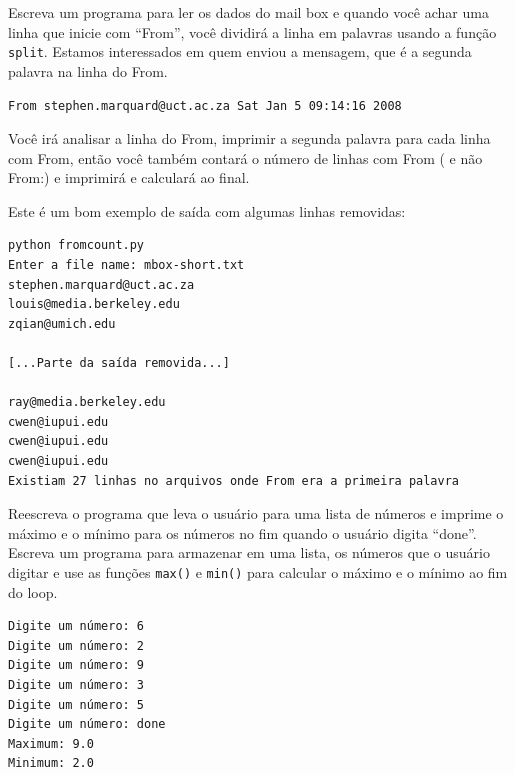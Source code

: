 \begin{ex}
Escreva um programa para ler os dados do mail box e quando você achar
uma linha que inicie com ``From'', você dividirá a linha em palavras 
usando a função {\tt split}. Estamos interessados em quem enviou a mensagem,
que é a segunda palavra na linha do From.

{\tt From stephen.marquard@uct.ac.za Sat Jan  5 09:14:16 2008 }

Você irá analisar a linha do From, imprimir a segunda palavra
para cada linha com From, então você também contará o número de 
linhas com From ( e não From:) e imprimirá e calculará ao final.

Este é um bom exemplo de saída com algumas linhas removidas:

\beforeverb
\begin{verbatim}
python fromcount.py 
Enter a file name: mbox-short.txt
stephen.marquard@uct.ac.za
louis@media.berkeley.edu
zqian@umich.edu

[...Parte da saída removida...]

ray@media.berkeley.edu
cwen@iupui.edu
cwen@iupui.edu
cwen@iupui.edu
Existiam 27 linhas no arquivos onde From era a primeira palavra
\end{verbatim}
\afterverb
%
\end{ex}

\begin{ex}

Reescreva o programa que leva o usuário para uma lista de 
números e imprime o máximo e o mínimo para os números no fim 
quando o usuário digita ``done''. Escreva um programa para armazenar
em uma lista, os números que o usuário digitar e use as funções
{\tt max()} e {\tt min()} para calcular o máximo e o mínimo ao fim
do loop.

\beforeverb
\begin{verbatim}
Digite um número: 6
Digite um número: 2
Digite um número: 9
Digite um número: 3
Digite um número: 5
Digite um número: done
Maximum: 9.0
Minimum: 2.0
\end{verbatim}
\afterverb
%

\end{ex}